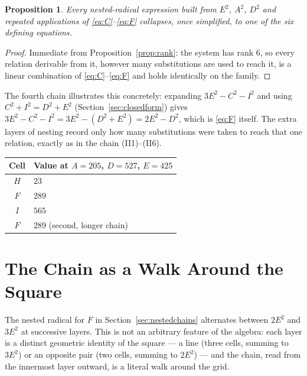 \documentclass[12pt]{article}
\newtheorem{proposition}[theorem]{Proposition}
\theoremstyle{remark}
\begin{document}
\begin{proposition}\label{prop:chaincollapse}
Every nested-radical expression built from $E^2$, $A^2$, $D^2$ and
repeated applications of \eqref{eq:C}--\eqref{eq:F} collapses, once
simplified, to one of the six defining equations.
\end{proposition}

\begin{proof}
Immediate from Proposition~\ref{prop:rank}: the system has rank $6$, so
every relation derivable from it, however many substitutions are used
to reach it, is a linear combination of \eqref{eq:C}--\eqref{eq:F} and
holds identically on the family.
\end{proof}

The fourth chain illustrates this concretely: expanding
$3E^2-C^2-I^2$ and using $C^2+I^2=D^2+E^2$
(Section~\ref{sec:closedform}) gives
$3E^2-C^2-I^2=3E^2-(D^2+E^2)=2E^2-D^2$, which is \eqref{eq:F} itself.
The extra layers of nesting record only how many substitutions were
taken to reach that one relation, exactly as in the
chain (II1)--(II6).

\begin{center}
\begin{tabular}{cl}
\hline
Cell & Value at $A=205$, $D=527$, $E=425$ \\
\hline
$H$ & $23$ \\
$F$ & $289$ \\
$I$ & $565$ \\
$F$ & $289$ (second, longer chain) \\
\hline
\end{tabular}
\end{center}

\section{The Chain as a Walk Around the Square}\label{sec:walk}

The nested radical for $F$ in Section~\ref{sec:nestedchains} alternates
between $2E^2$ and $3E^2$ at successive layers. This is not an
arbitrary feature of the algebra: each layer is a distinct geometric
identity of the square --- a line (three cells, summing to $3E^2$) or
an opposite pair (two cells, summing to $2E^2$) --- and the chain, read
from the innermost layer outward, is a literal walk around the grid.
\end{document}

